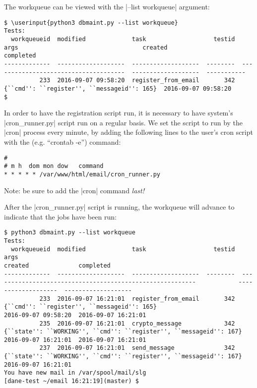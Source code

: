 \documentclass[preprint,3p,11pt]{elsarticle}
\newcommand\userinput[1]{\textbf{#1}}
\begin{document}
The workqueue can be viewed with the |--list workqueue| argument:

\begin{Verbatim}[commandchars=\\\{\}]
$ \userinput{python3 dbmaint.py --list workqueue}
Tests:
  workqueueid  modified             task                   testid  args                                   created                completed
-------------  -------------------  -------------------  --------  -------------------------------------  -------------------  -----------
          233  2016-09-07 09:58:20  register_from_email       342  {``cmd'': ``register'', ``messageid'': 165}  2016-09-07 09:58:20
$
\end{Verbatim}


In order to have the registration script run, it is necessary to have
system's |cron_runner.py| script run on a regular basis. We set the
script to run by the |cron| process every minute, by adding the
following lines to the user's cron script with the (e.g. ``crontab
-e'') command:

\begin{Verbatim}
#
# m h  dom mon dow   command
* * * * * /var/www/html/email/cron_runner.py
\end{Verbatim}

Note: be sure to add the |cron| command \emph{last!}

After the |cron_runner.py| script is running, the workqueue will
advance to indicate that the jobs have been run:

\begin{Verbatim}[commandchars=\\\{\}]
 $ python3 dbmaint.py --list workqueue
Tests:
  workqueueid  modified             task                   testid  args                                                                 created              completed
-------------  -------------------  -------------------  --------  ---------------------------------------------------------            -------------------  -------------------
          233  2016-09-07 16:21:01  register_from_email       342  {``cmd'': ``register'', ``messageid'': 165}                          2016-09-07 09:58:20  2016-09-07 16:21:01
          235  2016-09-07 16:21:01  crypto_message            342  {``state'': ``WORKING'', ``cmd'': ``register'', ``messageid'': 167}  2016-09-07 16:21:01  2016-09-07 16:21:01
          237  2016-09-07 16:21:01  send_message              342  {``state'': ``WORKING'', ``cmd'': ``register'', ``messageid'': 167}  2016-09-07 16:21:01
You have new mail in /var/spool/mail/slg
[dane-test ~/email 16:21:19](master) $
\end{Verbatim}
\end{document}
